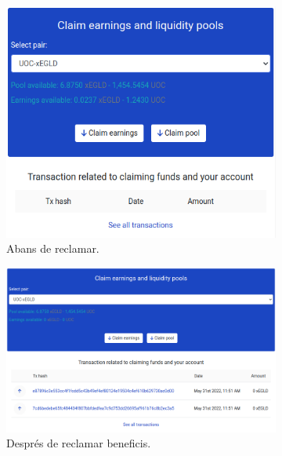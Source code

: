 \documentclass[11pt,a4paper]{article}
\begin{document}
\begin{figure}[!htb]
	\begin{subfigure}[b]{0.3\textwidth}
	  \includegraphics[width=\linewidth]{imp-fons1.png}
	  \caption{Abans de reclamar.}\label{fig:imp-fons1}
	\end{subfigure}\hfill
	\begin{subfigure}[b]{0.3\textwidth}
	  \includegraphics[width=\linewidth]{imp-fons2.png}
	  \caption{Després de reclamar beneficis.}\label{fig:imp-fons2}
	\end{subfigure}\hfill
	\begin{subfigure}[b]{0.3\textwidth}

\end{subfigure}
\end{figure}
\end{document}
